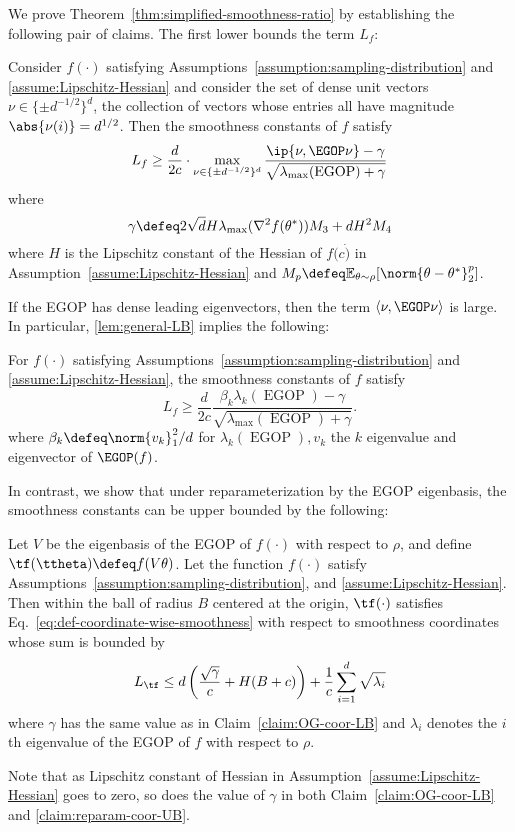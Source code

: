 We prove Theorem~\ref{thm:simplified-smoothness-ratio} by establishing the following pair of claims. The first lower bounds the term $L_f$:
\begin{lemma}\label{lem:general-LB}
    Consider $f(\cdot)$ satisfying Assumptions~\ref{assumption:sampling-distribution} and \ref{assume:Lipschitz-Hessian} and consider the set of dense unit vectors $\nu \in \{\pm d^{-1/2}\}^d$, the collection of vectors whose entries all have magnitude $\abs{\nu(i)} = d^{1/2}$. Then the smoothness constants of $f$ satisfy
    \[
        L_f \geq \frac{d}{2c}\cdot \max_{\nu \in \{\pm d^{-1/2}\}^d}\frac{\ip{\nu, \EGOP\nu} - \gamma}{\sqrt{\lambda_{\max}(\operatorname{EGOP}) + \gamma}}
    \]
    where
    \[
        \gamma \defeq  2\sqrt{d}H \lambda_{\max}(\nabla^2 f(\theta^*)) M_3 + dH^2 M_4
    \]
    where $H$ is the Lipschitz constant of the Hessian of $f(c\dot)$ in Assumption~\ref{assume:Lipschitz-Hessian} and $M_p\defeq \mathbb{E}_{\theta\sim\rho}[\norm{\theta-\theta^*}^p_2]$.
\end{lemma}
If the EGOP has dense leading eigenvectors, then the term $\langle\nu, \EGOP \nu\rangle$ is large. In particular, \cref{lem:general-LB} implies the following:
\begin{corollary}\label{claim:OG-coor-LB}
    For $f(\cdot)$ satisfying Assumptions~\ref{assumption:sampling-distribution} and \ref{assume:Lipschitz-Hessian}, the smoothness constants of $f$ satisfy
    \[
        L_f \geq \frac{d}{2c}\frac{\beta_k\lambda_k(\operatorname{EGOP}) - \gamma}{\sqrt{\lambda_{\max}(\operatorname{EGOP}) + \gamma}}.
    \]
    where $\beta_k \defeq \norm{v_k}^2_1/d$ for $\lambda_k(\operatorname{EGOP}), v_k$ the $k$ eigenvalue and eigenvector of $\EGOP(f)$.
\end{corollary}

In contrast, we show that under  reparameterization by the EGOP eigenbasis, the smoothness constants can be upper bounded by the following:
 
\begin{lemma}\label{claim:reparam-coor-UB}
    Let $V$ be the eigenbasis of the EGOP of $f(\cdot)$ with respect to $\rho$, and define $\tf(\ttheta)\defeq f(V\theta)$. Let the function $f(\cdot)$ satisfy Assumptions~\ref{assumption:sampling-distribution},  and \ref{assume:Lipschitz-Hessian}. Then within the ball of radius $B$ centered at the origin, $\tf(\cdot)$ satisfies Eq.~\ref{eq:def-coordinate-wise-smoothness} with respect to smoothness coordinates whose sum is bounded by
    \[
        L_{\tf} \leq d\left(\frac{\sqrt{\gamma}}{c} + H(B+c)\right)+ \frac{1}{c}\sum_{i=1}^d \sqrt{\lambda_i}
    \]
    where $\gamma$ has the same value as in Claim~\ref{claim:OG-coor-LB} and $\lambda_i$ denotes the $i$th eigenvalue of the EGOP of $f$ with respect to $\rho$.
\end{lemma}

Note that as Lipschitz constant of Hessian in Assumption~\ref{assume:Lipschitz-Hessian} goes to zero, so does the value of $\gamma$ in both Claim~\ref{claim:OG-coor-LB} and \ref{claim:reparam-coor-UB}.
